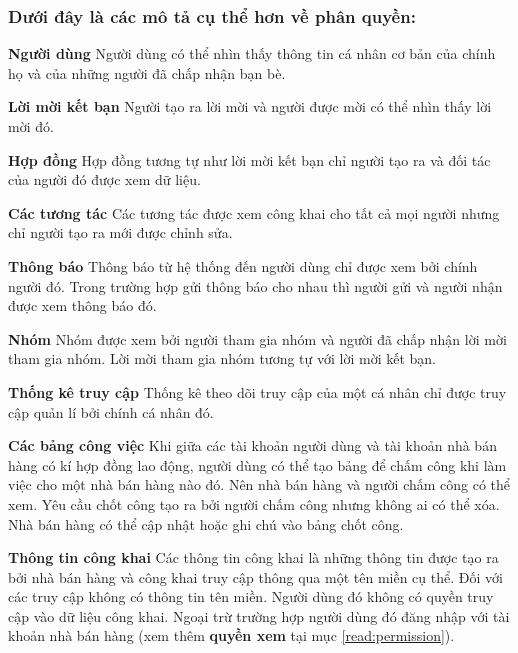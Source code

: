 \documentclass[11pt]{report}
\begin{document}
	
	\subsubsection{Dưới đây là các mô tả cụ thể hơn về phân quyền:}
	
	\textbf{Người dùng} Người dùng có thể nhìn thấy thông tin cá nhân cơ bản của chính họ và của những người đã chấp nhận bạn bè.
	
	\textbf{Lời mời kết bạn} Người tạo ra lời mời và người được mời có thể nhìn thấy lời mời đó.
	
	\textbf{Hợp đồng} Hợp đồng tương tự như lời mời kết bạn chỉ người tạo ra và đối tác của người đó được xem dữ liệu.
	
	\textbf{Các tương tác} Các tương tác được xem công khai cho tất cả mọi người nhưng chỉ người tạo ra mới được chỉnh sửa.
	
	\textbf{Thông báo} Thông báo từ hệ thống đến người dùng chỉ được xem bởi chính người đó. Trong trường hợp gửi thông báo cho nhau thì người gửi và người nhận được xem thông báo đó.
	
	\textbf{Nhóm} Nhóm được xem bởi người tham gia nhóm và người đã chấp nhận lời mời tham gia nhóm. Lời mời tham gia nhóm tương tự với lời mời kết bạn.
	
	\textbf{Thống kê truy cập} Thống kê theo dõi truy cập của một cá nhân chỉ được truy cập quản lí bởi chính cá nhân đó.
	
	\textbf{Các bảng công việc} Khi giữa các tài khoản người dùng và tài khoản nhà bán hàng có kí hợp đồng lao động, người dùng có thể tạo bảng để chấm công khi làm việc cho một nhà bán hàng nào đó. Nên nhà bán hàng và người chấm công có thể xem. Yêu cầu chốt công tạo ra bởi người chấm công nhưng không ai có thể xóa. Nhà bán hàng có thể cập nhật hoặc ghi chú vào bảng chốt công.
	
	\textbf{Thông tin công khai} Các thông tin công khai là những thông tin được tạo ra bởi nhà bán hàng và công khai truy cập thông qua một tên miền cụ thể. Đối với các truy cập không có thông tin tên miền. Người dùng đó không có quyền truy cập vào dữ liệu công khai. Ngoại trừ trường hợp người dùng đó đăng nhập với tài khoản nhà bán hàng (xem thêm \textbf{quyền xem} tại mục \ref{read:permission}).
	
\end{document}
